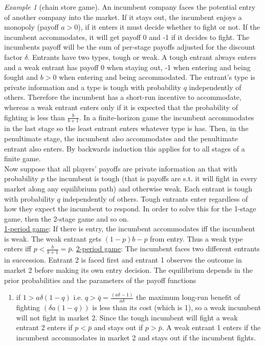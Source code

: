 \documentclass[a4paper, 12pt]{article}
\theoremstyle{plain}
\theoremstyle{definition}
\theoremstyle{lemma}
\theoremstyle{remark}
\theoremstyle{corollary}
\theoremstyle{example}
\newtheorem{example}[theorem]{Example}
\begin{document}
	\begin{example}[chain store game]
		An incumbent company faces the potential entry of another company into the market. If it stays out, the incumbent enjoys a monopoly (payoff $a>0$), if it enters it must decide whether to fight or not. If the incumbent accommodates, it will get payoff 0 and -1 if it decides to fight. The incumbents payoff will be the sum of per-stage payoffs adjusted for the discount factor $\delta$. Entrants have two types, tough or weak. A tough entrant always enters and a weak entrant has payoff 0 when staying out, -1 when entering and being fought and $b>0$ when entering and being accommodated. The entrant's type is private information and a type is tough with probability $q$ independently of others. Therefore the incumbent has a short-run incentive to accommodate, whereas a weak entrant enters only if it is expected that the probability of fighting is less than $\frac{b}{b+1}$. In a finite-horizon game the incumbent accommodates in the last stage so the least entrant enters whatever type is has. Then, in the penultimate stage, the incumbent also accommodates and the penultimate entrant also enters. By backwards induction this applies for to all stages of a finite game.\\
		Now suppose that all players' payoffs are private information an that with probability $p$ the incumbent is tough (that is payoffs are s.t. it will fight in every market along any equilibrium path) and otherwise weak. Each entrant is tough with probability $q$ independently of others. Tough entrants enter regardless of how they expect the incumbent to respond. In order to solve this for the 1-stage game, then the 2-stage game and so on.\\
		\underline{1-period game}: If there is entry, the incumbent accommodates iff the incumbent is weak. The weak entrant gets $(1-p)b-p$ from entry. Thus a weak type enters iff $p<\frac{b}{b+1} = \bar p$.
		\underline{2-period game}: The incumbent faces two different entrants in succession. Entrant 2 is faced first and entrant 1 observes the outcome in market 2 before making its own entry decision. The equilibrium depends in the prior probabilities and the parameters of the payoff functions \begin{enumerate}
			\item if $1>a\delta(1-q)$ i.e. $q>\bar q = \frac{(a\delta-1)}{a\delta}$ the maximum long-run benefit of fighting $(\delta a(1-q))$ is less than its cost (which is 1), so a weak incumbent will not fight in market 2. Since the tough incumbent will fight a weak entrant 2 enters if $p < \bar p$ and stays out if $p>\bar p$. A weak entrant 1 enters if the incumbent accommodates in market 2 and stays out if the incumbent fights.

\end{enumerate}
\end{example}
\end{document}
